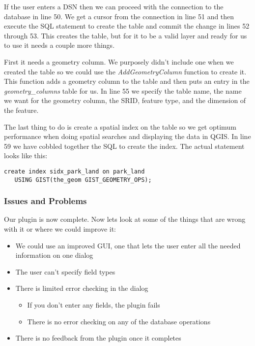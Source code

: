 If the user enters a DSN then we can proceed with the connection to the 
database in line 50. We get a cursor from the connection in 
line 51 and then execute the SQL statement to create the 
table and commit the change in lines 52 through 53. 
This creates the table, but for it to be a valid layer and ready for us to
use it needs a couple more things. 

First it needs a geometry column. We purposely didn't include one
when we created the table so we could use the \textsl{AddGeometryColumn} 
function to create it. This function adds a geometry column to the table 
and then puts an entry in the \textsl{geometry\_columns} table for us. In 
line 55 we specify the table name, the name we want for the 
geometry column, the SRID, feature type, and the dimension of the feature. 

The last thing to do is create a spatial index on the table so we get 
optimum performance when doing spatial searches and displaying the data 
in QGIS. In line 59 we have cobbled together the SQL to create the 
index. The actual statement looks like this:

\begin{verbatim}
create index sidx_park_land on park_land 
   USING GIST(the_geom GIST_GEOMETRY_OPS);
\end{verbatim}

\subsubsection{Issues and Problems}

Our plugin is now complete. Now lets look at some of the things that are 
wrong with it or where we could improve it:

\begin{itemize}
\item We could use an improved GUI, one that lets the user enter all the 
  needed information on one dialog
\item The user can't specify field types
\item There is limited error checking in the dialog
  \begin{itemize}
    \item If you don't enter any fields, the plugin fails
    \item There is no error checking on any of the database operations
  \end{itemize} 
\item There is no feedback from the plugin once it completes
\end{itemize} 

